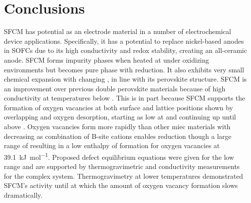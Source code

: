 \section{Conclusions}
    SFCM has potential as an electrode material in a number of electrochemical device applications.
    Specifically, it has a potential to replace nickel-based anodes in SOFCs due to its high conductivity and redox stability, creating an all-ceramic anode.
    SFCM forms impurity phases when heated at  under oxidizing environments but becomes pure phase with reduction.
    It also exhibits very small chemical expansion with changing , in line with its perovskite structure.
    SFCM is an improvement over previous double perovskite materials because of high conductivity at temperatures below .
    This is in part because SFCM supports the formation of oxygen vacancies at both surface and lattice positions shown by overlapping \textalpha{} and \textbeta{} oxygen desorption, starting as low at  and continuing up until above .
    Oxygen vacancies form more rapidly than other \gls{miec} materials with decreasing  as combination of B-site cations enables reduction though a large range of  resulting in a low enthalpy of formation for oxygen vacancies at \SI{39.1}{\kilo\joule\per\mol}.
    Proposed defect equilibrium equations were given for the low  range and are supported by thermogravimetric and conductivity measurements for the complex system.
    Thermogravimetry at lower temperatures demonstrated SFCM's activity until  at which the amount of oxygen vacancy formation slows dramatically.
